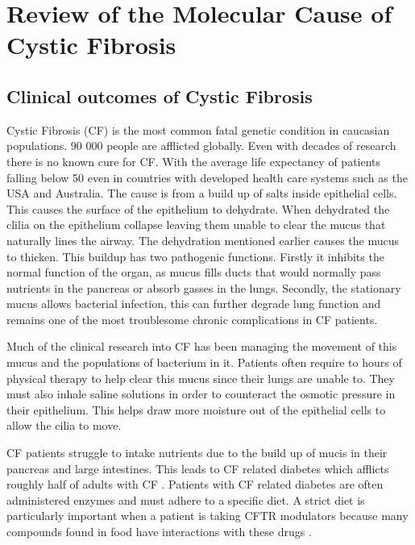 \chapter{Review of the Molecular Cause of Cystic Fibrosis}
\label{chap:cftr_review}
\newpage
\section{Clinical outcomes of Cystic Fibrosis}
Cystic Fibrosis (CF) is the most common fatal genetic condition in caucasian populations. 90 000 people are afflicted globally. Even with decades of research there is no known cure for CF. With the average life expectancy of patients falling below 50 even in countries with developed health care systems such as the USA and Australia\cite{}\cite{}. The cause is from a build up of salts inside epithelial cells. This causes the surface of the epithelium to dehydrate. When dehydrated the clilia on the epithelium collapse leaving them unable to clear the mucus that naturally lines the airway\cite{boucher2006}. The dehydration mentioned earlier causes the mucus to thicken. This buildup has two pathogenic functions. Firstly it inhibits the normal function of the organ, as mucus fills ducts that would normally pass nutrients in the pancreas or absorb gasses in the lungs. Secondly, the stationary mucus allows bacterial infection, this can further degrade lung function and remains one of the most troublesome chronic complications in CF patients. 

Much of the clinical research into CF has been managing the movement of this mucus and the populations of bacterium in it. Patients often require to hours of physical therapy to help clear this mucus since their lungs are unable to. They must also inhale saline solutions in order to counteract the osmotic pressure in their epithelium. This helps draw more moisture out of the epithelial cells to allow the cilia to move. 

CF patients struggle to intake nutrients due to the build up of mucis in their pancreas and large intestines. This leads to CF related diabetes which afflicts roughly half of adults with CF \cite{kayani2018}. Patients with CF related diabetes are often administered enzymes and must adhere to a specific diet. A strict diet is particularly important when a patient is taking CFTR modulators because many compounds found in food have interactions with these drugs \cite{}.

